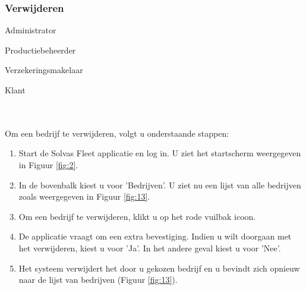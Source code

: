 \documentclass[11pt,openany]{article}
\newcommand{\cmark}{\ding{51}}%
\newcommand{\xmark}{\ding{55}}%
\newcommand{\done}{\rlap{$\square$}{\raisebox{2pt}{\large\hspace{1pt}\cmark}}%
	\hspace{-2.5pt}}
\newcommand{\wontfix}{\rlap{$\square$}{\large\hspace{1pt}\xmark}}
\begin{document}
\subsubsection{Verwijderen}
\begin{todolist}
	\item[\done] Administrator
	\item[\done] Productiebeheerder
	\item[\done] Verzekeringsmakelaar
	\item[\wontfix] Klant 
\end{todolist}
\\
\\
Om een bedrijf te verwijderen, volgt u onderstaande stappen:
\begin{enumerate}
	\item Start de Solvas Fleet applicatie en log in. U ziet het startscherm weergegeven in Figuur \ref{fig:2}.
	\item In de bovenbalk kiest u voor 'Bedrijven'. U ziet nu een lijst van alle bedrijven zoals weergegeven in Figuur \ref{fig:13}.
	\item Om een bedrijf te verwijderen, klikt u op het rode vuilbak icoon. 
	\item De applicatie vraagt om een extra bevestiging. Indien u wilt doorgaan met het verwijderen, kiest u voor 'Ja'. In het andere geval kiest u voor 'Nee'.
	\item Het systeem verwijdert het door u gekozen bedrijf en u bevindt zich opnieuw naar de lijst van bedrijven (Figuur \ref{fig:13}).
\end{enumerate}
\end{document}
